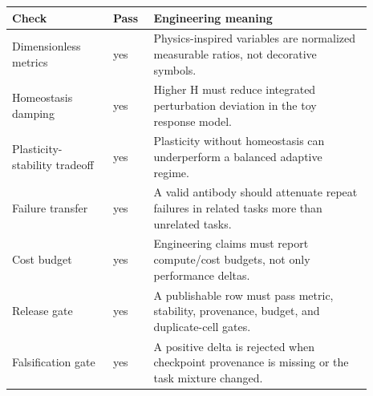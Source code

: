 \begin{tabular}{p{0.25\linewidth}p{0.10\linewidth}p{0.54\linewidth}}
\toprule
Check & Pass & Engineering meaning \\
\midrule
Dimensionless metrics & yes & Physics-inspired variables are normalized measurable ratios, not decorative symbols. \\
Homeostasis damping & yes & Higher H must reduce integrated perturbation deviation in the toy response model. \\
Plasticity-stability tradeoff & yes & Plasticity without homeostasis can underperform a balanced adaptive regime. \\
Failure transfer & yes & A valid antibody should attenuate repeat failures in related tasks more than unrelated tasks. \\
Cost budget & yes & Engineering claims must report compute/cost budgets, not only performance deltas. \\
Release gate & yes & A publishable row must pass metric, stability, provenance, budget, and duplicate-cell gates. \\
Falsification gate & yes & A positive delta is rejected when checkpoint provenance is missing or the task mixture changed. \\
\bottomrule
\end{tabular}
